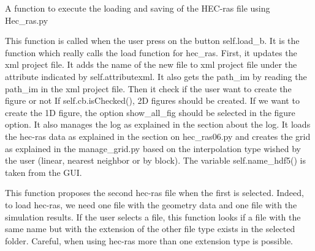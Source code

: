 \documentclass[letterpaper,10pt,english]{sphinxmanual}
\begin{document}
\begin{fulllineitems}
\begin{fulllineitems}
\end{fulllineitems}


\begin{fulllineitems}
\label{\detokenize{index:src_GUI.hydro_GUI_2.HEC_RAS1D.load_hec_ras_gui}}
A function to execute the loading and saving of the HEC-ras file using Hec\_ras.py


This function is called when the user press on the button self.load\_b. It is the function which really
calls the load function for hec\_ras. First, it updates the xml project file. It adds the name of the new file
to xml project file under the attribute indicated by self.attributexml. It also gets the path\_im by reading the
path\_im in the xml project file. Then it check if the user want to create the figure or not
If self.cb.isChecked(), 2D figures should be created. If we want to create the 1D figure, the option show\_all\_fig
should be selected in the figure option. It also manages the log as explained in the section about the log.
It loads the hec-ras data as explained in the section on hec\_ras06.py and creates the grid as explained
in the manage\_grid.py based on the interpolation type wished by the user (linear, nearest neighbor or by block).
The variable self.name\_hdf5() is taken from the GUI.

\end{fulllineitems}


\begin{fulllineitems}
\label{\detokenize{index:src_GUI.hydro_GUI_2.HEC_RAS1D.propose_next_file}}
This function proposes the second hec-ras file when the first is selected.  Indeed, to load hec-ras, we need
one file with the geometry data and one file with the simulation results. If the user selects a file, this
function looks if a file with the same name but with the extension of the other file type exists in the
selected folder. Careful, when using hec-ras more than one extension type is possible.

\end{fulllineitems}


\end{fulllineitems}
\end{document}
